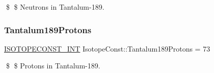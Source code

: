 \$ \$ Neutrons in Tantalum-\/189. \mbox{\label{group___isotope_const-_tantalum-_ta189_gaf7fa664d95888b0e964e16b9ed4fc1b9}} 
\subsubsection{\texorpdfstring{Tantalum189\+Protons}{Tantalum189Protons}}
{\footnotesize\ttfamily \mbox{\hyperlink{group___isotope_const-_macros_ga5f18360b3e99483a35c32d789e62621c}{I\+S\+O\+T\+O\+P\+E\+C\+O\+N\+S\+T\+\_\+\+I\+NT}} Isotope\+Const\+::\+Tantalum189\+Protons = 73}

\$ \$ Protons in Tantalum-\/189. 